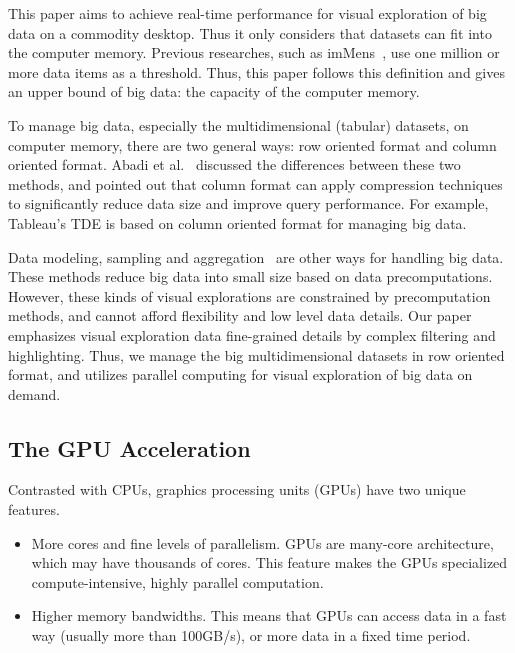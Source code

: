 This paper aims to achieve real-time performance for visual exploration of big data on a commodity desktop. Thus it only considers that datasets can fit into the computer memory. Previous researches, such as  imMens~\cite{2013-immens}, use one million or more data items as a threshold. Thus, this paper follows this definition and gives an upper bound of  big data: the capacity of the computer memory.

To manage big data, especially the multidimensional (tabular) datasets, on computer memory, there are two general ways: row oriented format and column oriented format. Abadi et al.~\cite{Abadi:2008} discussed the differences between these two methods, and pointed out that column format can apply compression techniques to significantly reduce data size and improve query performance. For example, Tableau's TDE is based on column oriented format for managing big data.

Data modeling, sampling and aggregation~\cite{2013-immens} are other ways for handling big data. These methods reduce big data into small size based on data precomputations. However, these kinds of  visual explorations are constrained by precomputation methods, and cannot afford flexibility and low level data details. Our paper emphasizes  visual exploration data fine-grained details by complex filtering and highlighting. Thus, we manage the big multidimensional datasets in row oriented format, and utilizes parallel computing for visual exploration of big data on demand. %

\subsection{The GPU Acceleration}

Contrasted with CPUs, graphics processing units (GPUs) have two unique features.

\begin{itemize}
	\item More cores and fine levels of parallelism. GPUs are many-core architecture, which may have thousands of cores.  This feature makes the GPUs  specialized compute-intensive, highly parallel computation. 
	\item Higher memory bandwidths. This means that  GPUs can access data in a fast way (usually more than 100GB/s), or more data in a fixed time period.
\end{itemize}

